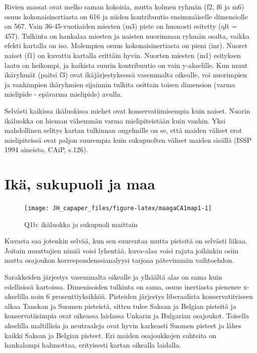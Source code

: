 \documentclass[
  finnish,
]{book}
\begin{document}
Rivien massat ovat melko saman kokoisia, mutta kolmen ryhmän (f2, f6 ja m6)
osuus kokonaisinertiasta on 616 ja niiden kontribuutio ensimmäiselle dimensiolle
on 567. Vain 36-45-vuotiaiden miesten (m3) piste on huonosti esitetty (qlt = 457).
Tulkinta on hankalaa miesten ja naisten nuorimman ryhmän osalta, vaikka efekti
kartalla on iso. Molempien osuus kokonaisinertiasta on pieni (inr). Nuoret naiset
(f1) on kuvattu kartalla erittäin hyvin. Nuorten miesten (m1) esityksen laatu
on heikompi, ja kaikista suurin kontribuutio on vain y-akselille. Kun muut
ikäryhmät (paitsi f3) ovat ikäjärjestyksessä vasemmalta oikealle, voi nuorimpien
ja vanhimpien ikäryhmien sijainnin tulkita osittain toisen dimension (varma
mielipide - epävarma mielipide) avulla.

Selvästi kaikissa ikäluokissa miehet ovat konservatiimisempia kuin naiset.
Nuorin ikäluokka on hieman vähemmän varma mielipiteistään kuin vanhin.
Yksi mahdollinen selitys kartan tulkinnan ongelmille on se, että maiden väliset
erot mielipiteissä ovat paljon suurempia kuin sukupuolten väliset maiden sisällä
(ISSP 1994 aineisto, CAiP, s.126).

\hypertarget{ikuxe4-sukupuoli-ja-maa}{%
\section{Ikä, sukupuoli ja maa}\label{ikuxe4-sukupuoli-ja-maa}}

\begin{figure}

{\centering \texttt{[image: JH\_capaper\_files/figure-latex/maagaCA1map1-1]} 

}

\caption{Q1b: ikäluokka ja sukupuoli maittain}\label{fig:maagaCA1map1}
\end{figure}

Kuvasta saa jotenkin selvää, kun sen suurentaa mutta pisteitä on selvästi liikaa.
Joitain muuttujien nimiä voisi lyhentää, kuva-alaa voisi rajata joihinkin osiin
mutta osajoukon korrespondenssianalyysi tarjoaa pätevimmän vaihtoehdon.

Sarakkeiden järjestys vasemmalta oikealle ja ylhäältä alas on sama kuin edellisissä
kartoissa. Dimenisoiden tulkinta on sama, osuus inertiasta pienenee x-akselilla
noin 6 prosenttiyksikköä. Pisteiden järjestys liberaalista konservatiiviseen
alkaa Tanskan ja Suomen pisteistä, sitten tulee Saksan ja Belgian pisteitä ja
konservatiisimpia ovat oikeassa laidassa Unkarin ja Bulgarian osajoukot. Toisella
akselilla maltillisia ja neutraaleja ovat hyvin karkeasti Suomen pisteet ja lähes
kaikki Saksan ja Belgian pisteet. Eri maiden osajoukkojen suhteita on hankalampi
hahmottaa, erityisesti kartan oikealla laidalla.
\end{document}
